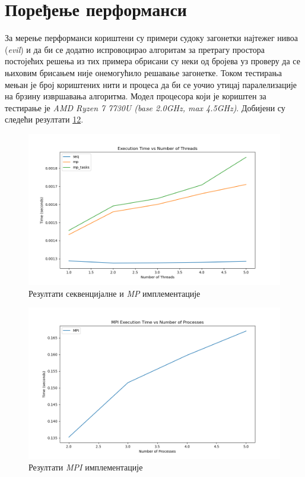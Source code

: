 \section{Поређење перформанси}
За мерење перформанси кориштени су примери судоку загонетки најтежег нивоа (\textit{evil}) и да би се додатно испровоцирао алгоритам за претрагу простора постојећих решења из тих примера обрисани су неки од бројева уз проверу да се њиховим брисањем није онемогућило решавање загонетке. Током тестирања мењан је број кориштених нити и процеса да би се уочио утицај паралелизације на брзину извршавања алгоритма. Модел процесора који је кориштен за тестирање је \textit{AMD Ryzen 7 7730U (base 2.0GHz, max 4.5GHz)}. Добијени су следећи резултати \ref{fig:seq_mp_results}\ref{fig:mpi_results}.

\begin{figure}[H]
    \centering
    \includegraphics[width=1\textwidth]{images/graph_1.png}
    \caption{Резултати секвенцијалне и \textit{MP} имплементације}
    \label{fig:seq_mp_results}
\end{figure}

\begin{figure}[H]
    \centering
    \includegraphics[width=1\textwidth]{images/graph_2.png}
    \caption{Резултати \textit{MPI} имплементације}
    \label{fig:mpi_results}
\end{figure}

